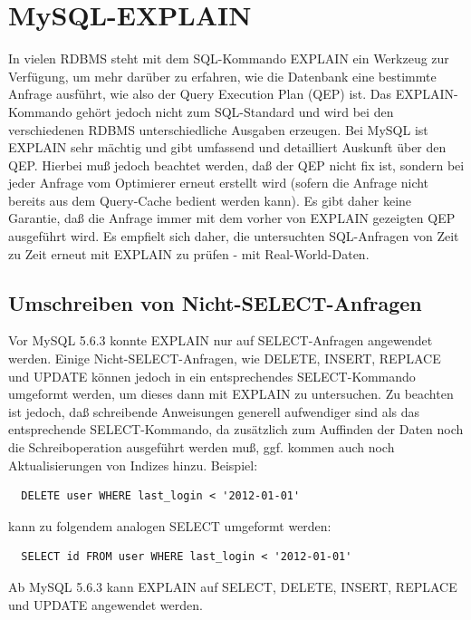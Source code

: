 \section{MySQL-EXPLAIN}
In vielen RDBMS steht mit dem SQL-Kommando EXPLAIN ein Werkzeug zur Verfügung, um mehr darüber zu erfahren, wie die Datenbank eine bestimmte Anfrage ausführt, wie also der Query Execution Plan (QEP) ist. Das EXPLAIN-Kommando gehört jedoch nicht zum SQL-Standard und wird bei den verschiedenen RDBMS unterschiedliche Ausgaben erzeugen. Bei MySQL ist EXPLAIN sehr mächtig und gibt umfassend und detailliert Auskunft über den QEP. Hierbei muß jedoch beachtet werden, daß der QEP nicht fix ist, sondern bei jeder Anfrage vom Optimierer erneut erstellt wird (sofern die Anfrage nicht bereits aus dem Query-Cache bedient werden kann). Es gibt daher keine Garantie, daß die Anfrage immer mit dem vorher von EXPLAIN gezeigten QEP ausgeführt wird. Es empfielt sich daher, die untersuchten SQL-Anfragen von Zeit zu Zeit erneut mit EXPLAIN zu prüfen - mit Real-World-Daten.

\subsection{Umschreiben von Nicht-SELECT-Anfragen}
Vor MySQL 5.6.3 konnte EXPLAIN nur auf SELECT-Anfragen angewendet werden. \cite{refman3}
Einige Nicht-SELECT-Anfragen, wie DELETE, INSERT, REPLACE und UPDATE können jedoch in ein entsprechendes SELECT-Kommando umgeformt werden, um dieses dann mit EXPLAIN zu untersuchen. Zu beachten ist jedoch, daß schreibende Anweisungen generell aufwendiger sind als das entsprechende SELECT-Kommando, da zusätzlich zum Auffinden der Daten noch die Schreiboperation ausgeführt werden muß, ggf. kommen auch noch Aktualisierungen von Indizes hinzu.
Beispiel:
\begin{lstlisting}
  DELETE user WHERE last_login < '2012-01-01'
\end{lstlisting}
kann zu folgendem analogen SELECT umgeformt werden:
\begin{lstlisting}
  SELECT id FROM user WHERE last_login < '2012-01-01'
\end{lstlisting}
Ab MySQL 5.6.3 kann EXPLAIN auf SELECT, DELETE, INSERT, REPLACE und UPDATE angewendet werden.\cite{refman3}

